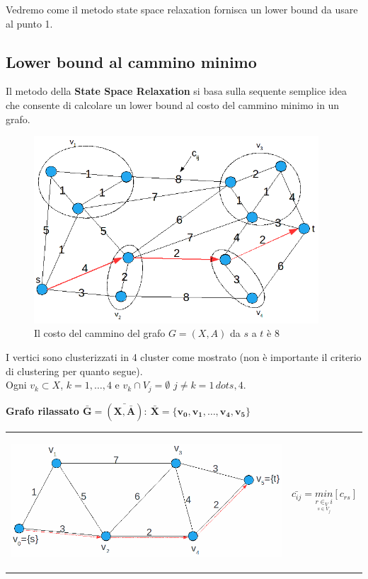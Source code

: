 Vedremo come il metodo state space relaxation fornisca un lower bound da usare al punto 1.

\subsection{Lower bound al cammino minimo}
Il metodo della \textbf{State Space Relaxation} si basa sulla sequente semplice idea che consente di calcolare un lower bound al costo del cammino minimo in un grafo.
\begin{figure}[!h]
	\centering
	\includegraphics[height=7cm]{images/graph42.png}
	\caption{Il costo del cammino del grafo $G=(X,A)$ da $s$ a $t$ è 8}
\end{figure}

I vertici sono clusterizzati in 4 cluster come mostrato (non è importante il criterio di clustering per quanto segue).\\
Ogni $v_{k}\subset X$, $k=1,\dots,4$ e $v_{k}\cap V_{j}=\emptyset$ $j\neq k=1\,dots,4$.

\clearpage
\textbf{Grafo rilassato $\boldsymbol{\bar{G}=(\bar{X,\bar{A}}):\ \bar{X}=\{v_{0},v_{1},\dots,v_{4},v_{5}\}}$}
\begin{table}[!h]
	\begin{tabular}{m{11cm} m{5cm}}
		\includegraphics[height=5cm]{images/graph43.png} & \begin{equation*}
			\bar{c_{ij}}=\underset{\underset{s\in V_{j}}{r\in _V{i}}}{min}[c_{rs}]
		\end{equation*}
	\end{tabular}
\end{table}

